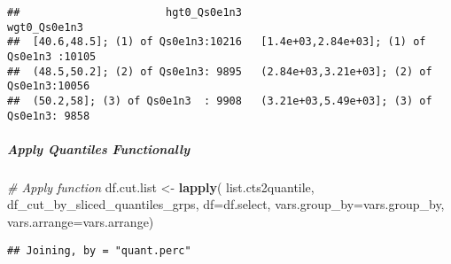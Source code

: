 \documentclass[
]{article}
\newenvironment{Shaded}{\begin{snugshade}}{\end{snugshade}}
\newcommand{\CommentTok}[1]{\textcolor[rgb]{0.56,0.35,0.01}{\textit{#1}}}
\newcommand{\ControlFlowTok}[1]{\textcolor[rgb]{0.13,0.29,0.53}{\textbf{#1}}}
\newcommand{\DataTypeTok}[1]{\textcolor[rgb]{0.13,0.29,0.53}{#1}}
\newcommand{\KeywordTok}[1]{\textcolor[rgb]{0.13,0.29,0.53}{\textbf{#1}}}
\newcommand{\NormalTok}[1]{#1}
\newcommand{\OperatorTok}[1]{\textcolor[rgb]{0.81,0.36,0.00}{\textbf{#1}}}
\newcommand{\StringTok}[1]{\textcolor[rgb]{0.31,0.60,0.02}{#1}}
\begin{document}
\begin{verbatim}
##                       hgt0_Qs0e1n3                                wgt0_Qs0e1n3  
##  [40.6,48.5]; (1) of Qs0e1n3:10216   [1.4e+03,2.84e+03]; (1) of Qs0e1n3 :10105  
##  (48.5,50.2]; (2) of Qs0e1n3: 9895   (2.84e+03,3.21e+03]; (2) of Qs0e1n3:10056  
##  (50.2,58]; (3) of Qs0e1n3  : 9908   (3.21e+03,5.49e+03]; (3) of Qs0e1n3: 9858
\end{verbatim}

\hypertarget{apply-quantiles-functionally}{%
\subparagraph{Apply Quantiles
Functionally}\label{apply-quantiles-functionally}}

\begin{Shaded}
\end{Shaded}

\begin{Shaded}
\begin{Highlighting}[]
\CommentTok{# Apply function}
\NormalTok{df.cut.list <-}\StringTok{ }\KeywordTok{lapply}\NormalTok{(}
\NormalTok{  list.cts2quantile, df_cut_by_sliced_quantiles_grps,}
  \DataTypeTok{df=}\NormalTok{df.select, }\DataTypeTok{vars.group_by=}\NormalTok{vars.group_by, }\DataTypeTok{vars.arrange=}\NormalTok{vars.arrange)}
\end{Highlighting}
\end{Shaded}

\begin{verbatim}
## Joining, by = "quant.perc"
\end{verbatim}

\begin{Shaded}
\end{Shaded}
\end{document}
